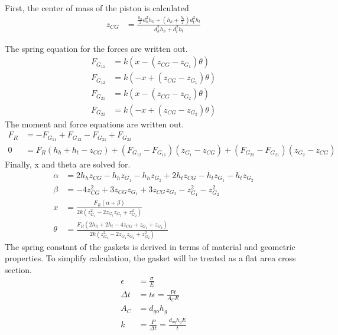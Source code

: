 \documentclass[10pt,a4paper]{article}
\begin{document}
	First, the center of mass of the piston is calculated
	\begin{align}
		z_{CG} &= \frac{\frac{h_h}{2}d_h^2 h_h + (h_h+ \frac{h_t}{2}) d_t^2 h_t}{d_h^2 h_h + d_t^2 h_t }
	\end{align}
	
	The spring equation for the forces are written out.
	\begin{align}
		F_{G_{11}} &= k(x - (z_{CG}-z_{G_1}) \theta) \\
		F_{G_{12}} &= k(-x + (z_{CG}-z_{G_1}) \theta) \\
		F_{G_{21}} &= k(x - (z_{CG}-z_{G_2}) \theta) \\
		F_{G_{22}} &= k(-x + (z_{CG}-z_{G_2}) \theta) 
	\end{align}
	The moment and force equations are written out.
	\begin{align}
		F_R &= - F_{G_{11}} + F_{G_{12}} - F_{G_{21}} + F_{G_{22}}\\
		0 &= F_R (h_h + h_t - z_{CG}) + (F_{G_{12}} - F_{G_{11}})(z_{G_1} - z_{CG})+ (F_{G_{22}} - F_{G_{21}})(z_{G_2} - z_{CG})
	\end{align}
	Finally, x and theta are solved for.
	\begin{align}
	\alpha &= 2 h_{h} z_{CG} - h_{h} z_{G_1} - h_{h} z_{G_2} + 2 h_{t} z_{CG} - h_{t} z_{G_1} - h_{t} z_{G_2}\\
	\beta &= - 4 z_{CG}^{2} + 3 z_{CG} z_{G_1} + 3 z_{CG} z_{G_2} - z_{G_1}^{2} - z_{G_2}^{2}\\
		x &= \frac{F_{R} \left(\alpha +\beta\right)}{2 k \left(z_{G_1}^{2} - 2 z_{G_1} z_{G_2} + z_{G_2}^{2}\right)}\\
		\theta &= \frac{F_{R} \left(2 h_{h} + 2 h_{t} - 4 z_{CG} + z_{G_1} + z_{G_2}\right)}{2 k \left(z_{G_1}^{2} - 2 z_{G_1} z_{G_2} + z_{G_2}^{2}\right)}
	\end{align}
	The spring constant of the gaskets is derived in terms of material and geometric properties. To simplify calculation, the gasket will be treated as a flat area cross section.
	\begin{align}
		\epsilon &= \frac{\sigma}{E}\\
		\Delta t &= t \epsilon = \frac{Pt}{A_C E} \\
		A_C &= d_{go} h_g \\
		k &= \frac{P}{\Delta t} = \frac{d_{og} h_g E}{t}
	\end{align}
\end{document}
